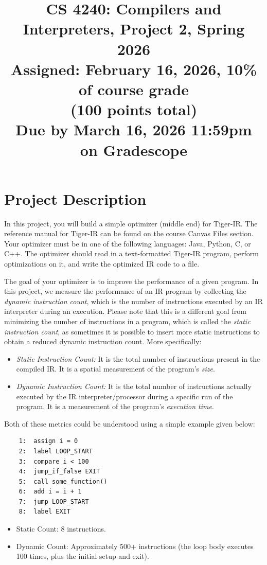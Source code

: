 \documentclass[12pt]{article}
\title{CS 4240: Compilers and Interpreters, Project 2, Spring 2026\\
\Large
Assigned: February 16, 2026, 10\% of course grade\\
(100 points total)\\
Due by March 16, 2026 11:59pm on Gradescope
}
\author{}
\date{}
\begin{document}
\maketitle
\thispagestyle{fancy}

\section{Project Description}
In this project, you will build a simple optimizer (middle end) for Tiger-IR. 
The reference manual for Tiger-IR can be found on the course Canvas Files section.
Your optimizer must be in one of the following languages: Java, Python, C, or C++. The optimizer should read in a text-formatted Tiger-IR program, perform optimizations on it,
and write the optimized IR code to a file.

The goal of your optimizer is to improve the performance of a given program.
In this project, we measure the performance of an IR program by collecting the \emph{dynamic instruction count},
which is the number of instructions executed by an IR interpreter during an execution.
Please note that this is a different goal from minimizing the number of instructions in a program,
which is called the \emph{static instruction count},
as sometimes it is possible to insert more static instructions to
obtain a reduced dynamic instruction count. More specifically:
\begin{itemize}
    \item \textit{Static Instruction Count:} It is the total number of instructions present in the compiled IR. It is a spatial measurement of the program's \textit{size}.
    \item \textit{Dynamic Instruction Count:} It is the total number of instructions actually executed by the IR interpreter/processor during a specific run of the program. It is a measurement of the program's \textit{execution time}.
\end{itemize}
Both of these metrics could be understood using a simple example given below:

\noindent %
\begin{minipage}{0.45\textwidth}
    \begin{center}
    \begin{lstlisting}
    1:  assign i = 0
    2:  label LOOP_START
    3:  compare i < 100
    4:  jump_if_false EXIT
    5:  call some_function()
    6:  add i = i + 1
    7:  jump LOOP_START
    8:  label EXIT
        \end{lstlisting}
    \end{center}
\end{minipage}%
\hfill%
\begin{minipage}{0.45\textwidth}
\begin{itemize}
    \item Static Count: 8 instructions.
    \item Dynamic Count: Approximately 500+ instructions (the loop body executes 100 times, plus the initial setup and exit).
\end{itemize}
\end{minipage}
\end{document}
